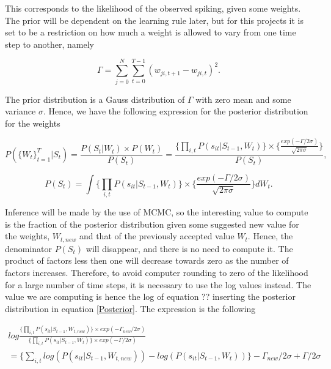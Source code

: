 This corresponds to the likelihood of the observed spiking, given some weights. The prior will be dependent on the learning rule later, but for this projects it is set to be a restriction on how much a weight is allowed to vary from one time step to another, namely

\begin{equation}
    \Gamma = \sum_{j=0}^{N} \sum_{t=0}^{T-1} (w_{ji,t+1}-w_{ji,t})^2.
\end{equation}

The prior distribution is a Gauss distribution of $\Gamma$ with zero mean and some variance $\sigma$. Hence, we have the following expression for the posterior distribution for the weights

\begin{equation}
\label{Posterior}
        P(\{W_t\}_{t=1}^{T}|S_t) = \frac{P(S_t|W_t)\times P(W_t)}{P(S_t)} = \frac{\Big\{\prod_{i,t} P(s_{it}|S_{t-1}, W_t)\Big\} \times \Big\{\frac{exp(-\Gamma /2\sigma)}{\sqrt{2\pi \sigma}}\Big\}}{P(S_t)}, 
\end{equation}

\begin{equation}
        P(S_t) = \int \Big\{\prod_{i,t} P(s_{it}|S_{t-1}, W_t)\Big\} \times \Big\{\frac{exp(-\Gamma /2\sigma)}{\sqrt{2\pi \sigma}}\Big\} d{W_t}.
\end{equation}

Inference will be made by the use of MCMC, so the interesting value to compute is the fraction of the posterior distribution given some suggested new value for the weights, $W_{t, new}$ and that of the previously accepted value $W_t$. Hence, the denominator $P(S_t)$ will disappear, and there is no need to compute it. The product of factors less then one will decrease towards zero as the number of factors increases. Therefore, to avoid computer rounding to zero of the likelihood for a large number of time steps, it is necessary to use the log values instead. The value we are computing is hence the log of equation ??  inserting the posterior distribution in equation \ref{Posterior}. The expression is the following

\begin{equation}
\label{eq:ratio}
\begin{split}
    log \frac{\big \{ \prod_{i,t} P(s_{it}|S_{t-1}, W_{t,new})\big \} \times exp(-\Gamma_{new} /2\sigma)}{\big \{ \prod_{i,t}  P(s_{it}|S_{t-1}, W_t) \big \} \times exp(-\Gamma /2\sigma)} \\
    = \Big \{ \sum_{i,t} log( P(s_{it}|S_{t-1}, W_{t,new})) - log( P(s_{it}|S_{t-1}, W_t)) \Big \} -\Gamma_{new} /2\sigma +  \Gamma /2\sigma
\end{split}
\end{equation}

